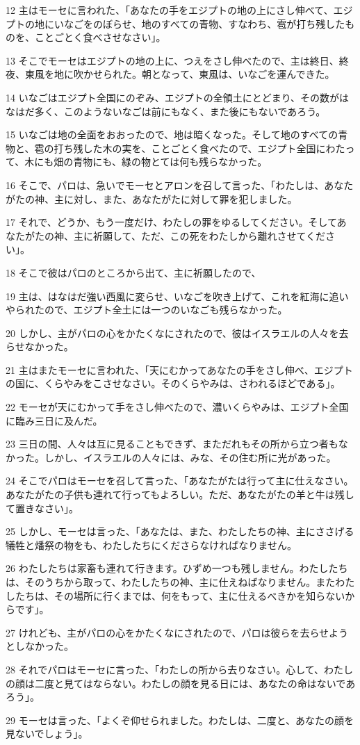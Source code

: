 \par 12 主はモーセに言われた、「あなたの手をエジプトの地の上にさし伸べて、エジプトの地にいなごをのぼらせ、地のすべての青物、すなわち、雹が打ち残したものを、ことごとく食べさせなさい」。
\par 13 そこでモーセはエジプトの地の上に、つえをさし伸べたので、主は終日、終夜、東風を地に吹かせられた。朝となって、東風は、いなごを運んできた。
\par 14 いなごはエジプト全国にのぞみ、エジプトの全領土にとどまり、その数がはなはだ多く、このようないなごは前にもなく、また後にもないであろう。
\par 15 いなごは地の全面をおおったので、地は暗くなった。そして地のすべての青物と、雹の打ち残した木の実を、ことごとく食べたので、エジプト全国にわたって、木にも畑の青物にも、緑の物とては何も残らなかった。
\par 16 そこで、パロは、急いでモーセとアロンを召して言った、「わたしは、あなたがたの神、主に対し、また、あなたがたに対して罪を犯しました。
\par 17 それで、どうか、もう一度だけ、わたしの罪をゆるしてください。そしてあなたがたの神、主に祈願して、ただ、この死をわたしから離れさせてください」。
\par 18 そこで彼はパロのところから出て、主に祈願したので、
\par 19 主は、はなはだ強い西風に変らせ、いなごを吹き上げて、これを紅海に追いやられたので、エジプト全土には一つのいなごも残らなかった。
\par 20 しかし、主がパロの心をかたくなにされたので、彼はイスラエルの人々を去らせなかった。
\par 21 主はまたモーセに言われた、「天にむかってあなたの手をさし伸べ、エジプトの国に、くらやみをこさせなさい。そのくらやみは、さわれるほどである」。
\par 22 モーセが天にむかって手をさし伸べたので、濃いくらやみは、エジプト全国に臨み三日に及んだ。
\par 23 三日の間、人々は互に見ることもできず、まただれもその所から立つ者もなかった。しかし、イスラエルの人々には、みな、その住む所に光があった。
\par 24 そこでパロはモーセを召して言った、「あなたがたは行って主に仕えなさい。あなたがたの子供も連れて行ってもよろしい。ただ、あなたがたの羊と牛は残して置きなさい」。
\par 25 しかし、モーセは言った、「あなたは、また、わたしたちの神、主にささげる犠牲と燔祭の物をも、わたしたちにくださらなければなりません。
\par 26 わたしたちは家畜も連れて行きます。ひずめ一つも残しません。わたしたちは、そのうちから取って、わたしたちの神、主に仕えねばなりません。またわたしたちは、その場所に行くまでは、何をもって、主に仕えるべきかを知らないからです」。
\par 27 けれども、主がパロの心をかたくなにされたので、パロは彼らを去らせようとしなかった。
\par 28 それでパロはモーセに言った、「わたしの所から去りなさい。心して、わたしの顔は二度と見てはならない。わたしの顔を見る日には、あなたの命はないであろう」。
\par 29 モーセは言った、「よくぞ仰せられました。わたしは、二度と、あなたの顔を見ないでしょう」。


